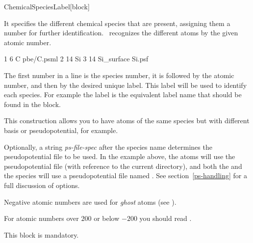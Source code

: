   
  \begin{fdfentry}{ChemicalSpeciesLabel}[block]
  
    It specifies the different chemical species that are
    present, assigning them a number for further identification.
    \siesta\ recognizes the different atoms by the given atomic number.
  
    \begin{fdfexample}
          1   6   C    pbe/C.psml
          2  14   Si
          3  14   Si_surface  Si.psf
    \end{fdfexample}
    The first number in a line is the species number, it is followed by
    the atomic number, and then by the desired unique label. This label
    will be used to identify each species. For example the label is the
    equivalent label name that should be found in the 
    block.
  
    This construction allows you to have atoms of the same species but
    with different basis or pseudopotential, for example.
  
    Optionally, a string \textit{ps-file-spec} after the species name
    determines the pseudopotential file to be used.  In the example
    above, the  atoms will use the pseudopotential file
     (with reference to the current directory), and
    both the  and the  species will use a
    pseudopotential file named . See
    section~\ref{ps-handling} for a full discussion of options.
  
    Negative atomic numbers are used for \emph{ghost} atoms (see ).
  
    For atomic numbers over $200$ or below $-200$ you should read
    .
  
    \note This block is mandatory.
  
  \end{fdfentry}
  
  
  
